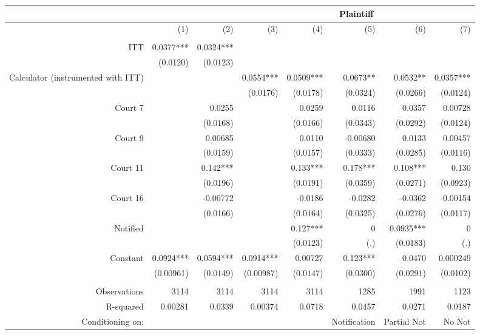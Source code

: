 \begin{tabular}{rrrrrrrr}
\toprule
      &       &       & \multicolumn{5}{c}{Plaintiff } \\
\midrule
      & (1)   & (2)   & (3)   & (4)   & (5)   & (6)   & (7) \\
      &       &       &       &       &       &       &  \\
ITT   & 0.0377*** & 0.0324*** &       &       &       &       &  \\
      & (0.0120) & (0.0123) &       &       &       &       &  \\
Calculator (instrumented with ITT) &       &       & 0.0554*** & 0.0509*** & 0.0673** & 0.0532** & 0.0357*** \\
      &       &       & (0.0176) & (0.0178) & (0.0324) & (0.0266) & (0.0124) \\
Court 7 &       & 0.0255 &       & 0.0259 & 0.0116 & 0.0357 & 0.00728 \\
      &       & (0.0168) &       & (0.0166) & (0.0343) & (0.0292) & (0.0124) \\
Court 9 &       & 0.00685 &       & 0.0110 & -0.00680 & 0.0133 & 0.00457 \\
      &       & (0.0159) &       & (0.0157) & (0.0333) & (0.0285) & (0.0116) \\
Court 11 &       & 0.142*** &       & 0.133*** & 0.178*** & 0.108*** & 0.130 \\
      &       & (0.0196) &       & (0.0191) & (0.0359) & (0.0271) & (0.0923) \\
Court 16 &       & -0.00772 &       & -0.0186 & -0.0282 & -0.0362 & -0.00154 \\
      &       & (0.0166) &       & (0.0164) & (0.0325) & (0.0276) & (0.0117) \\
Notified &       &       &       & 0.127*** & 0     & 0.0935*** & 0 \\
      &       &       &       & (0.0123) & (.)   & (0.0183) & (.) \\
Constant & 0.0924*** & 0.0594*** & 0.0914*** & 0.00727 & 0.123*** & 0.0470 & 0.000249 \\
      & (0.00961) & (0.0149) & (0.00987) & (0.0147) & (0.0300) & (0.0291) & (0.0102) \\
      &       &       &       &       &       &       &  \\
Observations & 3114  & 3114  & 3114  & 3114  & 1285  & 1991  & 1123 \\
R-squared & 0.00281 & 0.0339 & 0.00374 & 0.0718 & 0.0457 & 0.0271 & 0.0187 \\
Conditioning on:  &       &       &       &       & Notification & Partial Not & No Not  \\
\bottomrule
\end{tabular}%

